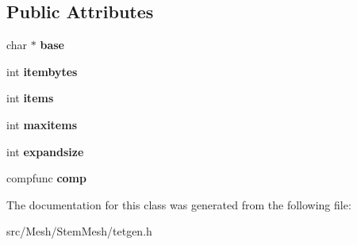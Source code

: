 \subsection*{Public Attributes}
\begin{DoxyCompactItemize}
\item 
\mbox{\label{classStemMesh3D_1_1tetgenmesh_1_1list_a3f162875d9b3437b6fc7062018a45b48}} 
char $\ast$ {\bfseries base}
\item 
\mbox{\label{classStemMesh3D_1_1tetgenmesh_1_1list_abe7daba7fd6723310561defc74f8c759}} 
int {\bfseries itembytes}
\item 
\mbox{\label{classStemMesh3D_1_1tetgenmesh_1_1list_afd78e49c41e0a166faf40d85379afec6}} 
int {\bfseries items}
\item 
\mbox{\label{classStemMesh3D_1_1tetgenmesh_1_1list_a6bc2578cc7332a5e92f8c21248d305be}} 
int {\bfseries maxitems}
\item 
\mbox{\label{classStemMesh3D_1_1tetgenmesh_1_1list_a62e4d76d5343eae99ac1330adeb7928a}} 
int {\bfseries expandsize}
\item 
\mbox{\label{classStemMesh3D_1_1tetgenmesh_1_1list_aa3733f509f961b4d8f1dcaec183eb862}} 
compfunc {\bfseries comp}
\end{DoxyCompactItemize}


The documentation for this class was generated from the following file\+:\begin{DoxyCompactItemize}
\item 
src/\+Mesh/\+Stem\+Mesh/tetgen.\+h\end{DoxyCompactItemize}
